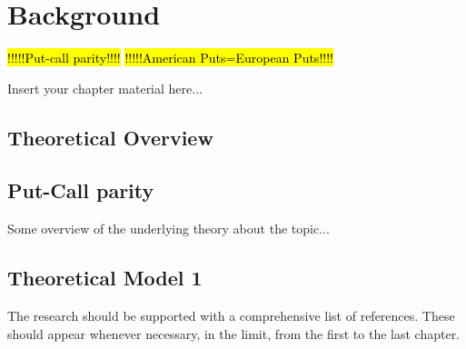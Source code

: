 
\chapter{Background}
\label{chapter:background}

\hl{!!!!!Put-call parity!!!!}
\hl{!!!!!American Puts=European Puts!!!!}



Insert your chapter material here...


\section{Theoretical Overview}
\label{section:overview}

\section{Put-Call parity}
\label{section:putcall parity}

Some overview of the underlying theory about the topic...


\section{Theoretical Model 1}
\label{section:theory1}

The research should be supported with a comprehensive list of references.
These should appear whenever necessary, in the limit, from the first to the last chapter.

